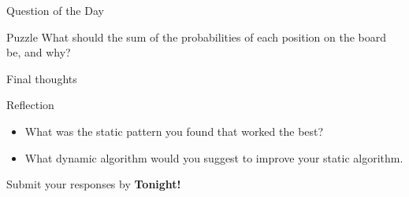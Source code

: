 \documentclass{beamer}
\begin{document}
\begin{frame}{Question of the Day}
\pause
  \begin{block}{Puzzle}
    What should the sum of the probabilities of each position on the board be, and why?
  \end{block}
\end{frame}

\begin{frame}{Final thoughts}
  \begin{block}{Reflection}
    \begin{itemize}
\pause
      \item What was the static pattern you found that worked the best?
\pause
      \item What dynamic algorithm would you suggest to improve your static algorithm.
    \end{itemize}
  \end{block}
\begin{center}
Submit your responses by \textbf{Tonight!}
\end{center}
\end{frame}
\end{document}
